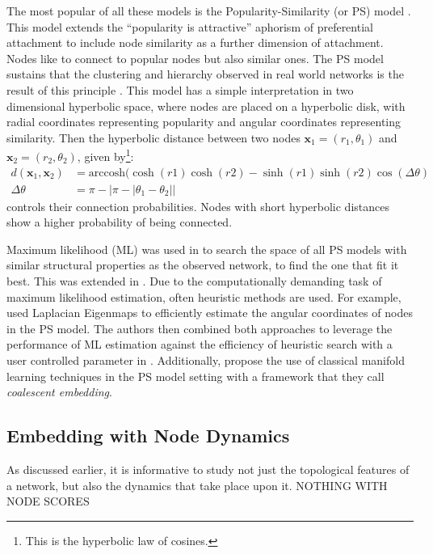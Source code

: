 \documentclass{report}
\begin{document}
	The most popular of all these models is the Popularity-Similarity (or PS) model \cite{papadopoulos2011popularity}. This model extends the ``popularity is attractive'' aphorism of preferential attachment to include node similarity as a further dimension of attachment. Nodes like to connect to popular nodes but also similar ones. The PS model sustains that the clustering and hierarchy observed in real world networks is the result of this principle \cite{alanis2016efficient}. This model has a simple interpretation in two dimensional hyperbolic space, where nodes are placed on a hyperbolic disk, with radial coordinates representing popularity and angular coordinates representing similarity. Then the hyperbolic distance between two nodes $\textbf{x}_1=(r_1, \theta_1)$ and $\textbf{x}_2=(r_2, \theta_2)$, given by\footnote{This is the hyperbolic law of cosines.}:
	\begin{align}
		d(\textbf{x}_1, \textbf{x}_2) &= \text{arccosh}(\cosh(r1)\cosh(r2) - \sinh(r1)\sinh(r2)\cos(\Delta\theta) \\
		\Delta\theta &= \pi - | \pi - | \theta_1 - \theta_2 | |
	\end{align}
	controls their connection probabilities. Nodes with short hyperbolic distances show a higher probability of being connected.
	
	Maximum likelihood (ML) was used in \cite{papadopoulos2011popularity} to search the space of all PS models with similar structural properties as the observed network, to find the one that fit it best. This was extended in \cite{papadopoulos2015network,papadopoulos2015network}. Due to the computationally demanding task of maximum likelihood estimation, often heuristic methods are used. For example, \cite{alanis2016efficient} used Laplacian Eigenmaps to efficiently estimate the angular coordinates of nodes in the PS model. The authors then combined both approaches to leverage the performance of ML estimation against the efficiency of heuristic search with a user controlled parameter in \cite{alanis2016manifold}. Additionally, \cite{thomas2016machine} propose the use of classical manifold learning techniques in the PS model setting with a framework that they call \textit{coalescent embedding}.
	
	\subsection{Embedding with Node Dynamics}
	As discussed earlier, it is informative to study not just the topological features of a network, but also the dynamics that take place upon it. 
	NOTHING WITH NODE SCORES
	
\end{document}
